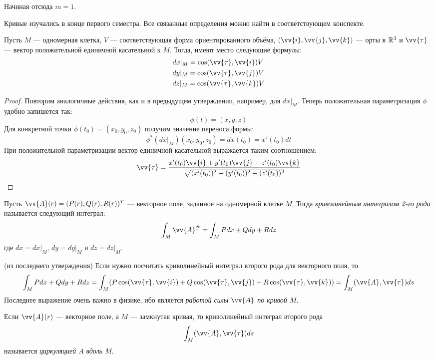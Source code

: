 \begin{note}
	Начиная отсюда $m = 1$.
\end{note}

\begin{reminder}
	Кривые изучались в конце первого семестра. Все связанные определения можно найти в соответствующем конспекте.
\end{reminder}

\begin{proposition}
	Пусть $M$ --- одномерная клетка, $V$ --- соответствующая форма ориентированного объёма, $(\vv{i}, \vv{j}, \vv{k})$ --- орты в $\mathbb{R}^3$ и $\vv{\tau}$ --- вектор положительной единичной касательной к $M$. Тогда, имеют место следующие формулы:
	\begin{align*}
		&{dx|_M = \cos(\vv{\tau}, \vv{i})V}
		\\
		&{dy|_M = \cos(\vv{\tau}, \vv{j})V}
		\\
		&{dz|_M = \cos(\vv{\tau}, \vv{k})V}
	\end{align*}
\end{proposition}

\begin{proof}
	Повторим аналогичные действия, как и в предыдущем утверждении, например, для $dx|_M$. Теперь положительная параметризация $\phi$ удобно запишется так:
	\[
		\phi(t) = (x, y, z)
	\]
	Для конкретной точки $\phi(t_0) = (x_0, y_0, z_0)$ получим значение переноса формы:
	\[
		\phi^*(dx|_M)(x_0, y_0, z_0) = dx(t_0) = x'(t_0)dt
	\]
	При положительной параметризации вектор единичной касательной выражается таким соотношением:
	\[
		\vv{\tau} = \frac{x'(t_0)\vv{i} + y'(t_0)\vv{j} + z'(t_0)\vv{k}}{\sqrt{(x'(t_0))^2 + (y'(t_0))^2 + (z'(t_0))^2}}
	\]
\end{proof}

\begin{definition}
	Пусть $\vv{A}(r) = (P(r), Q(r), R(r))^T$ --- векторное поле, заданное на одномерной клетке $M$. Тогда \textit{криволинейным интегралом 2-го рода} называется следующий интеграл:
	\[
		\int_M \vv{A}^\# = \int_M Pdx + Qdy + Rdz
	\]
	где $dx = dx|_M$, $dy = dy|_M$ и $dz = dz|_M$.
\end{definition}

\begin{corollary} (из последнего утверждения)
	Если нужно посчитать криволинейный интеграл второго рода для векторного поля, то
	\[
		\int_M Pdx + Qdy + Rdz = \int_M (P\cos(\vv{\tau}, \vv{i}) + Q\cos(\vv{\tau}, \vv{j}) + R\cos(\vv{\tau}, \vv{k})) = \int_M (\vv{A}, \vv{\tau})ds
	\]
	Последнее выражение очень важно в физике, ибо является \textit{работой силы $\vv{A}$ по кривой $M$}.
\end{corollary}

\begin{definition}
	Если $\vv{A}(r)$ --- векторное поле, а $M$ --- замкнутая кривая, то криволинейный интеграл второго рода
	\[
		\int_M (\vv{A}, \vv{\tau})ds
	\]
	называется \textit{циркуляцией $A$ вдоль $M$}.
\end{definition}